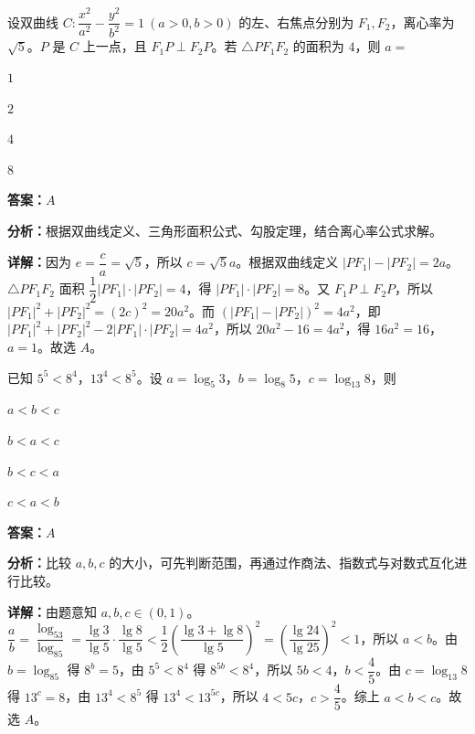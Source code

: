 \begin{question}[points=5]
设双曲线 $C:\dfrac{x^2}{a^2}-\dfrac{y^2}{b^2}=1\ (a>0,b>0)$ 的左、右焦点分别为 $F_1,F_2$，离心率为 $\sqrt{5}$。$P$ 是 $C$ 上一点，且 $F_1P\perp F_2P$。若 $\triangle PF_1F_2$ 的面积为 $4$，则 $a=$
\begin{choices}
  \item $1$
  \item $2$
  \item $4$
  \item $8$
\end{choices}
\begin{solution}
\textbf{答案：}$A$

\textbf{分析：}根据双曲线定义、三角形面积公式、勾股定理，结合离心率公式求解。

\textbf{详解：}因为 $e=\dfrac{c}{a}=\sqrt{5}$，所以 $c=\sqrt{5}a$。根据双曲线定义 $|PF_1|-|PF_2|=2a$。$\triangle PF_1F_2$ 面积 $\dfrac12|PF_1|\cdot|PF_2|=4$，得 $|PF_1|\cdot|PF_2|=8$。又 $F_1P\perp F_2P$，所以 $|PF_1|^2+|PF_2|^2=(2c)^2=20a^2$。而 $(|PF_1|-|PF_2|)^2=4a^2$，即 $|PF_1|^2+|PF_2|^2-2|PF_1|\cdot|PF_2|=4a^2$，所以 $20a^2-16=4a^2$，得 $16a^2=16$，$a=1$。故选 $A$。
\end{solution}
\end{question}

\begin{question}[points=5]
已知 $5^5<8^4$，$13^4<8^5$。设 $a=\log_5 3$，$b=\log_8 5$，$c=\log_{13}8$，则
\begin{choices}
  \item $a<b<c$
  \item $b<a<c$
  \item $b<c<a$
  \item $c<a<b$
\end{choices}
\begin{solution}
\textbf{答案：}$A$

\textbf{分析：}比较 $a,b,c$ 的大小，可先判断范围，再通过作商法、指数式与对数式互化进行比较。

\textbf{详解：}由题意知 $a,b,c\in(0,1)$。$\dfrac{a}{b}=\dfrac{\log_53}{\log_85}=\dfrac{\lg3}{\lg5}\cdot\dfrac{\lg8}{\lg5}<\dfrac{1}{2}\left(\dfrac{\lg3+\lg8}{\lg5}\right)^2=\left(\dfrac{\lg24}{\lg25}\right)^2<1$，所以 $a<b$。由 $b=\log_85$ 得 $8^b=5$，由 $5^5<8^4$ 得 $8^{5b}<8^4$，所以 $5b<4$，$b<\dfrac45$。由 $c=\log_{13}8$ 得 $13^c=8$，由 $13^4<8^5$ 得 $13^4<13^{5c}$，所以 $4<5c$，$c>\dfrac45$。综上 $a<b<c$。故选 $A$。
\end{solution}
\end{question}

